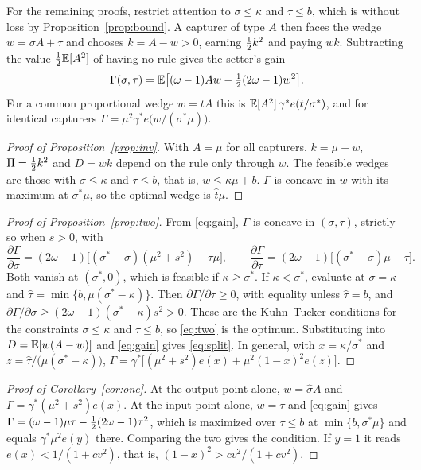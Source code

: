 For the remaining proofs, restrict attention to $\sigma\le\kappa$ and $\tau\le b$, which
is without loss by Proposition~\ref{prop:bound}. A capturer of type $A$ then faces the
wedge $w=\sigma A+\tau$ and chooses $k=A-w>0$, earning $\tfrac{1}{2} k^2$ and paying $wk$.
Subtracting the value $\tfrac{1}{2}\mathbb{E}[A^2]$ of having no rule gives the setter's gain
\begin{equation}\label{eq:gain}
  \Gamma(\sigma,\tau)=\mathbb{E}\bigl[(\omega-1)Aw-\tfrac{1}{2}(2\omega-1)w^2\bigr].
\end{equation}
For a common proportional wedge $w=tA$ this is
$\mathbb{E}[A^2]\,\gamma^*e(t/\sigma^*)$, and for identical capturers
$\Gamma=\mu^2\gamma^*e\bigl(w/(\sigma^*\mu)\bigr)$.

\begin{proof}[Proof of Proposition~\ref{prop:inv}]
With $A=\mu$ for all capturers, $k=\mu-w$, $\Pi=\tfrac{1}{2} k^2$ and $D=wk$ depend on the rule
only through $w$. The feasible wedges are those with $\sigma\le\kappa$ and $\tau\le b$,
that is, $w\le\kappa\mu+b$. $\Gamma$ is concave in $w$ with its maximum at $\sigma^*\mu$,
so the optimal wedge is $\hat t\mu$.
\end{proof}

\begin{proof}[Proof of Proposition~\ref{prop:two}]
From \eqref{eq:gain}, $\Gamma$ is concave in $(\sigma,\tau)$, strictly so when $s>0$, with
\[
  \frac{\partial\Gamma}{\partial\sigma}
     =(2\omega-1)\bigl[(\sigma^*-\sigma)(\mu^2+s^2)-\tau\mu\bigr], \qquad
  \frac{\partial\Gamma}{\partial\tau}
     =(2\omega-1)\bigl[(\sigma^*-\sigma)\mu-\tau\bigr].
\]
Both vanish at $(\sigma^*,0)$, which is feasible if $\kappa\ge\sigma^*$. If
$\kappa<\sigma^*$, evaluate at $\sigma=\kappa$ and
$\hat\tau=\min\{b,\mu(\sigma^*-\kappa)\}$. Then $\partial\Gamma/\partial\tau\ge 0$, with
equality unless $\hat\tau=b$, and
$\partial\Gamma/\partial\sigma\ge(2\omega-1)(\sigma^*-\kappa)s^2>0$. These are the
Kuhn--Tucker conditions for the constraints $\sigma\le\kappa$ and $\tau\le b$, so
\eqref{eq:two} is the optimum. Substituting into $D=\mathbb{E}[w(A-w)]$ and \eqref{eq:gain} gives
\eqref{eq:split}. In general, with $x=\kappa/\sigma^*$ and
$z=\hat\tau/\bigl(\mu(\sigma^*-\kappa)\bigr)$,
$\Gamma=\gamma^*\bigl[(\mu^2+s^2)e(x)+\mu^2(1-x)^2e(z)\bigr]$.
\end{proof}

\begin{proof}[Proof of Corollary~\ref{cor:one}]
At the output point alone, $w=\hat\sigma A$ and $\Gamma=\gamma^*(\mu^2+s^2)e(x)$. At the
input point alone, $w=\tau$ and \eqref{eq:gain} gives
$\Gamma=(\omega-1)\mu\tau-\tfrac{1}{2}(2\omega-1)\tau^2$, which is maximized over $\tau\le b$ at
$\min\{b,\sigma^*\mu\}$ and equals $\gamma^*\mu^2e(y)$ there. Comparing the two gives the
condition. If $y=1$ it reads $e(x)<1/(1+cv^2)$, that is,
$(1-x)^2>cv^2/(1+cv^2)$.
\end{proof}

